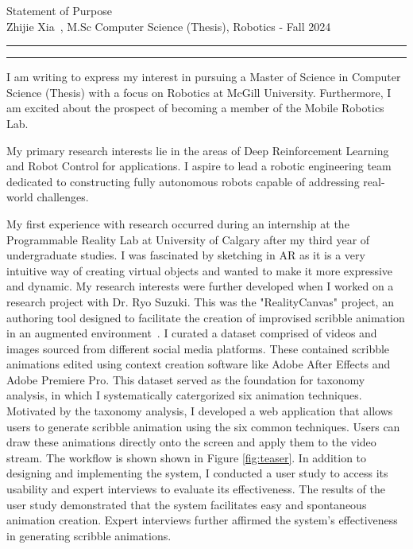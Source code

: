 \documentclass{article}
\newcommand{\soptitle}{Statement of Purpose}
\newcommand{\yourname}{Zhijie Xia}
\begin{document}
\begin{center}\LARGE\soptitle\\
\large \yourname\ , M.Sc Computer Science (Thesis), Robotics - Fall 2024
\end{center}

\hrule
\vspace{1pt}
\hrule height 1pt

\bigskip

I am writing to express my interest in pursuing a Master of Science in 
Computer Science (Thesis) with a focus on Robotics at McGill University.
Furthermore, I am excited about the prospect of becoming a member of the Mobile Robotics Lab.

My primary research interests lie in the areas of Deep Reinforcement Learning and Robot Control for applications.
I aspire to lead a robotic engineering team dedicated to constructing fully autonomous robots capable of addressing
real-world challenges.

My first experience with research occurred during an internship at the Programmable Reality Lab at University of Calgary 
after my third year of undergraduate studies. I was fascinated by sketching in AR as it is
a very intuitive way of creating virtual objects and wanted 
to make it more expressive and dynamic. 
My research interests were further developed when I worked on a research project with Dr. Ryo Suzuki. 
This was the "RealityCanvas" project, an authoring tool designed to facilitate the creation
of improvised scribble animation in an augmented environment~\cite{xia2023realitycanvas}.
I curated a dataset comprised of videos and images sourced from different social media platforms.
These contained scribble animations edited using context creation software like Adobe After Effects and Adobe Premiere Pro. 
This dataset served as the foundation for taxonomy analysis, in which I systematically catergorized
six animation techniques. Motivated by the taxonomy analysis,
I developed a web application that allows users to generate scribble animation using the six common techniques. 
Users can draw these animations directly onto the screen and apply them to the video stream. The workflow 
is shown shown in Figure \ref{fig:teaser}. In addition to designing and implementing the system, I conducted a user study to access its usability and expert
interviews to evaluate its effectiveness. The results of the user study demonstrated that the system facilitates
easy and spontaneous animation creation. Expert interviews further affirmed the system's effectiveness in generating 
scribble animations.
\end{document}
